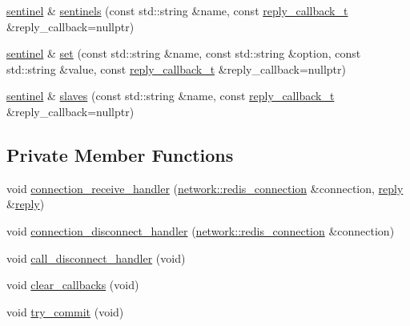 \begin{DoxyCompactItemize}
\item 
\hyperlink{classcpp__redis_1_1sentinel}{sentinel} \& \hyperlink{classcpp__redis_1_1sentinel_a38436712626f27867ecff225eed87a7f}{sentinels} (const std\+::string \&name, const \hyperlink{classcpp__redis_1_1sentinel_ae1a150ff8787208c47414397a061c9a7}{reply\+\_\+callback\+\_\+t} \&reply\+\_\+callback=nullptr)
\item 
\hyperlink{classcpp__redis_1_1sentinel}{sentinel} \& \hyperlink{classcpp__redis_1_1sentinel_a1579c9c9b8ac3cded0a7d70e709e5e1b}{set} (const std\+::string \&name, const std\+::string \&option, const std\+::string \&value, const \hyperlink{classcpp__redis_1_1sentinel_ae1a150ff8787208c47414397a061c9a7}{reply\+\_\+callback\+\_\+t} \&reply\+\_\+callback=nullptr)
\item 
\hyperlink{classcpp__redis_1_1sentinel}{sentinel} \& \hyperlink{classcpp__redis_1_1sentinel_aa4b19659807388d276764f9a79132d00}{slaves} (const std\+::string \&name, const \hyperlink{classcpp__redis_1_1sentinel_ae1a150ff8787208c47414397a061c9a7}{reply\+\_\+callback\+\_\+t} \&reply\+\_\+callback=nullptr)
\end{DoxyCompactItemize}
\subsection*{Private Member Functions}
\begin{DoxyCompactItemize}
\item 
void \hyperlink{classcpp__redis_1_1sentinel_af18d66cd6f5fc4408800fe16201cf9c8}{connection\+\_\+receive\+\_\+handler} (\hyperlink{classcpp__redis_1_1network_1_1redis__connection}{network\+::redis\+\_\+connection} \&connection, \hyperlink{classcpp__redis_1_1reply}{reply} \&\hyperlink{classcpp__redis_1_1reply}{reply})
\item 
void \hyperlink{classcpp__redis_1_1sentinel_a2b082c15a48316ae5e8b3ab301796e37}{connection\+\_\+disconnect\+\_\+handler} (\hyperlink{classcpp__redis_1_1network_1_1redis__connection}{network\+::redis\+\_\+connection} \&connection)
\item 
void \hyperlink{classcpp__redis_1_1sentinel_aa4721cc3a0b946fa54bb5d321b057a12}{call\+\_\+disconnect\+\_\+handler} (void)
\item 
void \hyperlink{classcpp__redis_1_1sentinel_a4f5364cf618fefe34ced591d698f5caf}{clear\+\_\+callbacks} (void)
\item 
void \hyperlink{classcpp__redis_1_1sentinel_ad27b6a3558e6d3a634df11dca80154df}{try\+\_\+commit} (void)
\end{DoxyCompactItemize}
